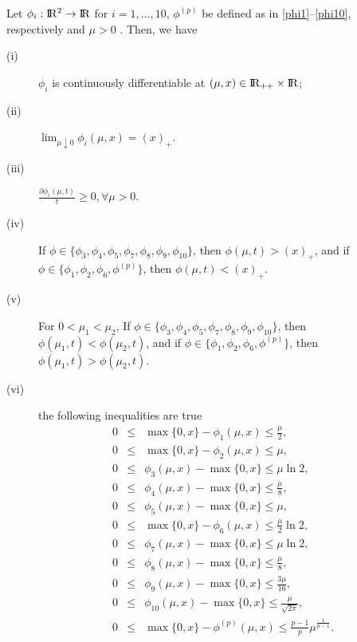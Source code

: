 \documentclass[12pt]{article}
\renewcommand{\Re}{{\rm I}\! {\rm R}}
\newcommand{\ds}{\displaystyle}
\begin{document}
 \begin{proposition} \label{approximationBound}
 Let $\phi_i:\Re^2 \to \Re$ for $i=1,\ldots, 10$, $\phi^{(p)}$ be defined as in
 \eqref{phi1}--\eqref{phi10}, respectively and  $\mu >0$ .
 Then, we have
    \begin{description}
    \item[(i)]  $\phi_{i}$ is continuously differentiable at
                $(\mu, x) \in \Re_{++} \times \Re$;
    \item[(ii)] $\ds \lim_{\mu \downarrow 0} \phi_{i} (\mu, x)=(x)_+$.
    \item[(iii)] $ \frac{\partial \phi_i(\mu,t)}{t} \geq 0,  \forall \mu >0.$
    \item[(iv)]  If $\phi \in \{\phi_3,\phi_4, \phi_5, \phi_7, \phi_8, \phi_9, \phi_{10} \}$,
                then $\phi(\mu,t) > (x)_+$, and if $\phi \in \{\phi_1, \phi_2, \phi_6, \phi^{(p)}\}$,
                then $\phi(\mu,t) < (x)_+$.
    \item[(v)] For $0< \mu_1 < \mu_2$, If $\phi \in \{\phi_3,\phi_4, \phi_5, \phi_7, 
                \phi_8, \phi_9, \phi_{10} \}$, then $\phi(\mu_1,t) < \phi(\mu_2,t)$, and
                if $\phi \in \{\phi_1, \phi_2, \phi_6, \phi^{(p)}\}$, then  $\phi(\mu_1,t) > \phi(\mu_2,t)$.
    \item[(vi)] the following inequalities are true
            \begin{eqnarray*}
                    0 &\leq & \max \{0,x\} -\phi_1(\mu,x)  \leq \frac{\mu}{2},\\
                    0 &\leq & \max \{0,x\} -\phi_2(\mu,x)  \leq \mu,\\
                    0 &\leq & \phi_3(\mu,x)-\max \{0,x\}  \leq \mu \ln 2,\\
                    0 &\leq & \phi_4(\mu,x)-\max \{0,x\}  \leq \frac{\mu }{8},\\
                    0 &\leq & \phi_5(\mu,x)-\max \{0,x\}  \leq \mu, \\
                    0 &\leq & \max \{0,x\} -\phi_6(\mu,x)  \leq  \frac{\mu}{2} \ln 2,\\
                    0 &\leq & \phi_7(\mu,x)-\max \{0,x\}  \leq  \mu \ln 2, \\
                    0 &\leq & \phi_8(\mu,x)-\max \{0,x\}  \leq  \frac{\mu}{8}, \\
                    0 &\leq & \phi_9(\mu,x)-\max \{0,x\}  \leq  \frac{3\mu}{16}, \\
                    0 &\leq & \phi_{10}(\mu,x)-\max \{0,x\}  \leq  \frac{\mu}{\sqrt{2\pi}}, \\
                    0 &\leq & \max \{0,x\} -\phi^{(p)}(\mu,x)  \leq \frac{p-1}{p}\mu^{\frac{1}{p-1}}.
            \end{eqnarray*}
    \end{description}
 \end{proposition}
\end{document}
